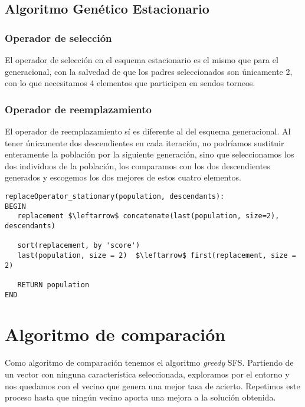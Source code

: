 \documentclass[11pt,leqno]{article}
\begin{document}
\subsection{Algoritmo Genético Estacionario}

\subsubsection{Operador de selección}

El operador de selección en el esquema estacionario es el mismo que para el generacional, con la salvedad de que los padres seleccionados son únicamente 2, con lo que necesitamos 4 elementos que participen en sendos torneos.

\subsubsection{Operador de reemplazamiento}
	
	El operador de reemplazamiento sí es diferente al del esquema generacional. Al tener únicamente dos descendientes en cada iteración, no podríamos sustituir enteramente la población por la siguiente generación, sino que seleccionamos los dos individuos de la población, los comparamos con los dos descendientes generados y escogemos los dos mejores de estos cuatro elementos.
	
\begin{lstlisting}[mathescape=true]
replaceOperator_stationary(population, descendants):
BEGIN
   replacement $\leftarrow$ concatenate(last(population, size=2), descendants)
   
   sort(replacement, by 'score')
   last(population, size = 2)  $\leftarrow$ first(replacement, size = 2)
   
   RETURN population
END
\end{lstlisting}	
	
\section{Algoritmo de comparación}

Como algoritmo de comparación tenemos el algoritmo \textit{greedy} SFS. Partiendo de un vector con ninguna característica seleccionada, exploramos por el entorno y nos quedamos con el vecino que genera una mejor tasa de acierto. Repetimos este proceso hasta que ningún vecino aporta una mejora a la solución obtenida.
\end{document}
